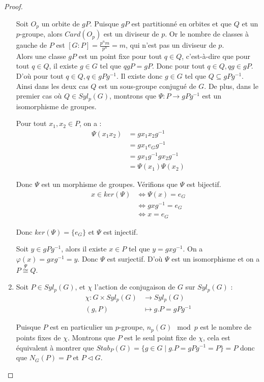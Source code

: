 \documentclass{article}
\theoremstyle{definition}
\theoremstyle{plain}
\theoremstyle{plain}
\theoremstyle{plain}
\theoremstyle{plain}
\theoremstyle{definition}
\theoremstyle{plain}
\theoremstyle{plain}
\begin{document}
\begin{proof}
\begin{enumerate}[label={\upshape(\roman*)}]
Soit \( O_{p} \) un orbite de \( gP \). Puisque \( gP \) est partitionné en orbites et que \( Q \) et un \(p\)-groupe, alors \( Card(O_{p}) \) est un diviseur de \( p \). Or le nombre de classes à gauche de \( P \) est \([G : P] = \frac{p^{n}m}{p^{n}} = m  \), qui n'est pas un diviseur de \( p \). \\
Alors une classe \( gP \) est un point fixe pour tout \( q \in Q \), c'est-à-dire que pour tout \( q \in Q \), il existe \( g \in G \) tel que \( qgP = gP \). 
Donc pour tout \( q \in Q, qg \in gP \). 
D'où pour tout \( q \in Q, q \in gPg^{-1} \). Il existe donc \( g \in G \) tel que \( Q \subseteq gPg^{-1} \).\\ 
Ainsi dans les deux cas \( Q \) est un sous-groupe conjugué de \( G \). 
De plus, dans le premier cas où \( Q \in Syl_p(G) \), montrons que \( \varPsi : P \rightarrow gPg^{-1} \) est un isomorphisme de groupes.

Pour tout \( x_1,x_2 \in P \), on a :
\begin{align*}
	\varPsi(x_1x_2) &= gx_1x_2g^{-1} \\
			&= gx_1e_Gg^{-1} \\
			&= gx_1g^{-1}gx_2g^{-1} \\
			&= \varPsi(x_1)\varPsi(x_2) 
\end{align*}

Donc \( \varPsi \) est un morphisme de groupes. Vérifions que \( \varPsi \) est bijectif.
\begin{align*}
	x \in ker(\varPsi) &\iff \varPsi(x) = e_G \\
			   &\iff gxg^{-1} = e_G \\
			   &\iff x = e_G
\end{align*}

Donc \( ker(\varPsi) = \{e_G\} \) et \( \varPsi \) est injectif. 

Soit \( y \in gPg^{-1} \), alors il existe \( x \in P \) tel que \( y = gxg^{-1} \). On a \( \varphi(x) = gxg^{-1} = y \). Donc \( \varPsi \) est surjectif. D'où \( \varPsi \) est un isomorphisme et on a \( P \overset{\varPsi}{\cong} Q \).

\item Soit \( P \in Syl_{p}(G) \), et \( \chi \) l'action de conjugaison de \( G \) sur \( Syl_{p}(G) \) :
\begin{align*}
	\chi : G \times Syl_{p}(G) &\to Syl_{p}(G) \\
	(g,P) &\mapsto g.P = gPg^{-1}
\end{align*}

Puisque \( P \) est en particulier un \(p\)-groupe, \( n_p(G) \mod p \) est le nombre de points fixes de \( \chi \). Montrons que \( P \) est le seul point fixe de \( \chi \), cela est équivalent à montrer que \( Stab_P(G) = \{ g \in G \mid g.P = gPg^{-1} = P \} = P \) donc que \( N_G(P) = P \) et \( P \triangleleft G \). 


\end{enumerate}
\end{proof}
\end{document}
